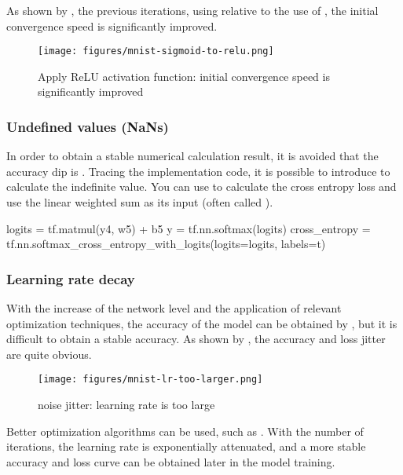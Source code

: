 \begin{content}
\begin{content}
As shown by , the previous  iterations, using  relative to the use of , the initial convergence speed is significantly improved.

\begin{figure}[H]
  \centering
  \texttt{[image: figures/mnist-sigmoid-to-relu.png]}
  \caption{Apply ReLU activation function: initial convergence speed is significantly improved}
  \label{fig:mnist-sigmoid-to-relu}
\end{figure}


\subsubsection{Undefined values (NaNs)}
In order to obtain a stable numerical calculation result, it is avoided that the accuracy dip is . Tracing the implementation code, it is possible to introduce  to calculate the  indefinite value. You can use  to calculate the cross entropy loss and use the linear weighted sum as its input (often called ).

\begin{leftbar}
\begin{python}
logits = tf.matmul(y4, w5) + b5
y = tf.nn.softmax(logits)
cross_entropy = tf.nn.softmax_cross_entropy_with_logits(logits=logits, labels=t)
\end{python}
\end{leftbar}


\subsubsection{Learning rate decay}
With the increase of the network level and the application of relevant optimization techniques, the accuracy of the model can be obtained by , but it is difficult to obtain a stable accuracy. As shown by , the accuracy and loss jitter are quite obvious.

\begin{figure}[H]
  \centering
  \texttt{[image: figures/mnist-lr-too-larger.png]}
  \caption{noise jitter: learning rate is too large}
  \label{fig:mnist-lr-too-larger}
\end{figure}

Better optimization algorithms can be used, such as . With the number of iterations, the learning rate is exponentially attenuated, and a more stable accuracy and loss curve can be obtained later in the model training.


\end{content}
\end{content}
